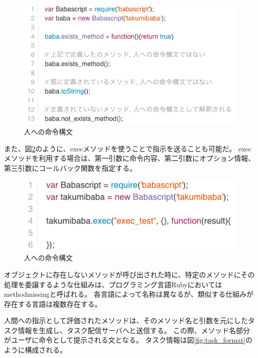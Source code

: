 \begin{figure}[htbp]
  \begin{center}
  \includegraphics[width=.8\linewidth,bb=0 0 577 330]{images/methodmissing_sample.js.png}
  \end{center}
  \caption{人への命令構文}
  \label{fig:methodmissing_sample}
\end{figure}

また、図\ref{fig:babascript_exec_method}のように、execメソッドを使うことで指示を送ることも可能だ。
execメソッドを利用する場合は、第一引数に命令内容、第二引数にオプション情報、第三引数にコールバック関数を指定する。

\begin{figure}[htbp]
  \begin{center}
  \includegraphics[width=.8\linewidth,bb=0 0 577 330]{images/babascript_exec_method.js.png}
  \end{center}
  \caption{人への命令構文}
  \label{fig:babascript_exec_method}
\end{figure}

オブジェクトに存在しないメソッドが呼び出された時に、特定のメソッドにその処理を委譲するような仕組みは、プログラミング言語Rubyにおいては
methodmissingと呼ばれる。
各言語によって名称は異なるが、類似する仕組みが存在する言語は複数存在する。

人間への指示として評価されたメソッドは、そのメソッド名と引数を元にしたタスク情報を生成し、タスク配信サーバへと送信する。
この際、メソッド名部分がユーザに命令として提示される文となる。
タスク情報は図\ref{fig:task_format}のように構成される。

